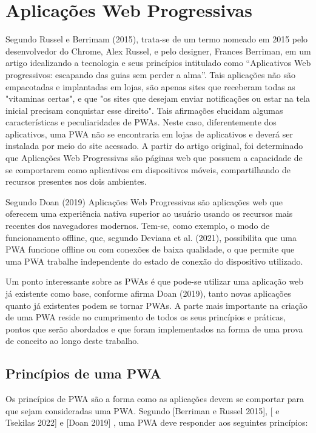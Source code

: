 \documentclass[12pt]{article}
\begin{document}
\section{Aplicações Web Progressivas} \label{sec:pwa}

Segundo Russel e Berrimam (2015), trata-se de um termo nomeado em 2015 pelo desenvolvedor do Chrome, Alex Russel, e pelo designer, Frances Berriman, em um artigo idealizando a tecnologia e seus princípios intitulado como “Aplicativos Web progressivos: escapando das guias sem perder a alma”. Tais aplicações não são empacotadas e implantadas em lojas, são apenas sites que receberam todas as "vitaminas certas", e que "os sites que desejam enviar notificações ou estar na tela inicial precisam conquistar esse direito". Tais afirmações elucidam algumas características e peculiaridades de PWAs. Neste caso, diferentemente dos aplicativos, uma PWA não se encontraria em lojas de aplicativos e deverá ser instalada por meio do site acessado. A partir do artigo original, foi determinado que Aplicações Web Progressivas são páginas web que possuem a capacidade de se comportarem como aplicativos em dispositivos móveis, compartilhando de recursos presentes nos dois ambientes. 

Segundo Doan (2019) Aplicações Web Progressivas são aplicações web que oferecem uma experiência nativa superior ao usuário usando os recursos mais recentes dos navegadores modernos. Tem-se, como exemplo, o modo de funcionamento offline, que, segundo Deviana et al. (2021), possibilita que uma PWA funcione offline ou com conexões de baixa qualidade, o que permite que uma PWA trabalhe independente do estado de conexão do dispositivo utilizado.

Um ponto interessante sobre as PWAs é que pode-se utilizar uma aplicação web já existente como base, conforme afirma Doan (2019), tanto novas aplicações quanto já existentes podem se tornar PWAs. A parte mais importante na criação de uma PWA reside no cumprimento de todos os seus princípios e práticas, pontos que serão abordados e que foram implementados na forma de uma prova de conceito ao longo deste trabalho.

\subsection{Princípios de uma PWA} \label{sec:principios}

Os princípios de PWA são a forma como as aplicações devem se comportar para que sejam consideradas uma PWA. Segundo [Berriman e Russel 2015], [ e Tsekilas 2022] e [Doan 2019] , uma PWA deve responder aos seguintes princípios:
\end{document}
